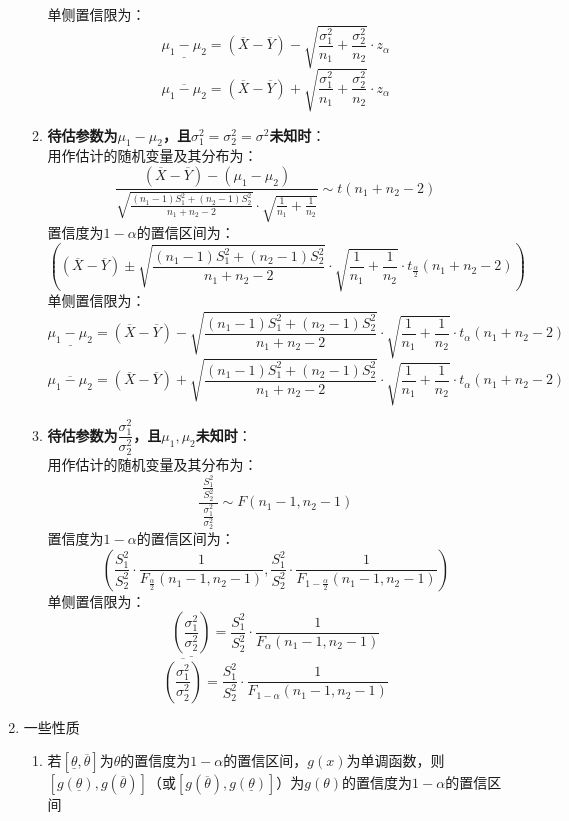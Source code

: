 \documentclass[12pt,a4paper,UTF8]{book}
\begin{document}
\begin{enumerate}
\begin{enumerate}
单侧置信限为：
\[\underline{\mu_1-\mu_2}=\left(\overline{X}-\overline{Y}\right)-\sqrt{\frac{\sigma_1^2}{n_1}+\frac{\sigma_2^2}{n_2}}\cdot z_{\alpha}\]
\[\overline{\mu_1-\mu_2}=\left(\overline{X}-\overline{Y}\right)+\sqrt{\frac{\sigma_1^2}{n_1}+\frac{\sigma_2^2}{n_2}}\cdot z_{\alpha}\]
\item \textbf{待估参数为$\mu_1-\mu_2$，且$\sigma_1^2=\sigma_2^2=\sigma^2$未知时}：\\
用作估计的随机变量及其分布为：
\[\frac{\left(\overline{X}-\overline{Y}\right)-\left(\mu_1-\mu_2\right)}{\sqrt{\frac{\left(n_1-1\right)S_1^2+\left(n_2-1\right)S_2^2}{n_1+n_2-2}}\cdot\sqrt{\frac{1}{n_1}+\frac{1}{n_2}}}\sim t\left(n_1+n_2-2\right)\]
置信度为$1-\alpha$的置信区间为：
\[\left(\left(\overline{X}-\overline{Y}\right)\pm\sqrt{\frac{\left(n_1-1\right)S_1^2+\left(n_2-1\right)S_2^2}{n_1+n_2-2}}\cdot\sqrt{\frac{1}{n_1}+\frac{1}{n_2}}\cdot t_{\frac{\alpha}{2}}\left(n_1+n_2-2\right)\right)\]
单侧置信限为：
\[\underline{\mu_1-\mu_2}=\left(\overline{X}-\overline{Y}\right)-\sqrt{\frac{\left(n_1-1\right)S_1^2+\left(n_2-1\right)S_2^2}{n_1+n_2-2}}\cdot\sqrt{\frac{1}{n_1}+\frac{1}{n_2}}\cdot t_{\alpha}\left(n_1+n_2-2\right)\]
\[\overline{\mu_1-\mu_2}=\left(\overline{X}-\overline{Y}\right)+\sqrt{\frac{\left(n_1-1\right)S_1^2+\left(n_2-1\right)S_2^2}{n_1+n_2-2}}\cdot\sqrt{\frac{1}{n_1}+\frac{1}{n_2}}\cdot t_{\alpha}\left(n_1+n_2-2\right)\]
\item \textbf{待估参数为$\dfrac{\sigma_1^2}{\sigma_2^2}$，且$\mu_1,\mu_2$未知时}：\\
用作估计的随机变量及其分布为：
\[\frac{\ \frac{S_1^2}{S_2^2}\ }{\ \frac{\sigma_1^2}{\sigma_2^2}\ }\sim F\left(n_1-1,n_2-1\right)\]
置信度为$1-\alpha$的置信区间为：
\[\left(\frac{S_1^2}{S_2^2}\cdot\frac{1}{F_{\frac{\alpha}{2}}\left(n_1-1,n_2-1\right)},\frac{S_1^2}{S_2^2}\cdot\frac{1}{F_{1-\frac{\alpha}{2}}\left(n_1-1,n_2-1\right)}\right)\]
单侧置信限为：
\[\underline{\left(\frac{\sigma_1^2}{\sigma_2^2}\right)}=\frac{S_1^2}{S_2^2}\cdot\frac{1}{F_{\alpha}\left(n_1-1,n_2-1\right)}\]
\[\overline{\left(\frac{\sigma_1^2}{\sigma_2^2}\right)}=\frac{S_1^2}{S_2^2}\cdot\frac{1}{F_{1-\alpha}\left(n_1-1,n_2-1\right)}\]
\end{enumerate}
\item 一些性质
\begin{enumerate}
\item 若$\left[\underline{\theta},\overline{\theta}\right]$为$\theta$的置信度为$1-\alpha$的置信区间，$g\left(x\right)$为单调函数，则$\left[g\left(\underline{\theta}\right),g\left(\overline{\theta}\right)\right]$（或$\left[g\left(\overline{\theta}\right),g\left(\underline{\theta}\right)\right]$）为$g\left(\theta\right)$的置信度为$1-\alpha$的置信区间
\end{enumerate}
\end{enumerate}
\end{document}
